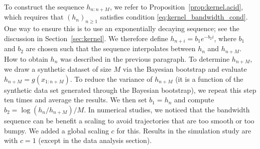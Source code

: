 \documentclass{article}
\theoremstyle{definition}
\renewcommand{\&}{and}
\begin{document}
To construct the sequence $h_{n:n+M}$, we refer to Proposition~\ref{prop:kernel.acid}, which requires that $(h_n)_{n \geq 1}$ satisfies condition \eqref{eq:kernel_bandwidth_cond}. One way to ensure this is to use an exponentially decaying sequence; see the discussion in Section~\ref{sec:kernel}. We therefore define $h_{n+i} = b_1 e^{-b_2 i}$, where $b_1$ and $b_2$ are chosen such that the sequence interpolates between $h_n$ and $h_{n+M}$. How to obtain $h_n$ was described in the previous paragraph. To determine $h_{n+M}$, we draw a synthetic dataset of size $M$ via the Bayesian bootstrap and evaluate $h_{n+M} = g(x_{1:n+M})$. %
To reduce the variance of $h_{n+M}$ (it is a function of the synthetic data set generated through the Bayesian bootstrap), we repeat this step ten times and average the results. We then set $b_1 = h_n$ and compute $b_2 = \log(h_n / h_{n+M}) / M$. In numerical studies, we noticed that the bandwidth sequence can be benefit a scaling to avoid trajectories that are too smooth or too bumpy. We added a global scaling $c$ for this. Results in the simulation study are with $c=1$ (except in the data analysis section).

\end{document}
